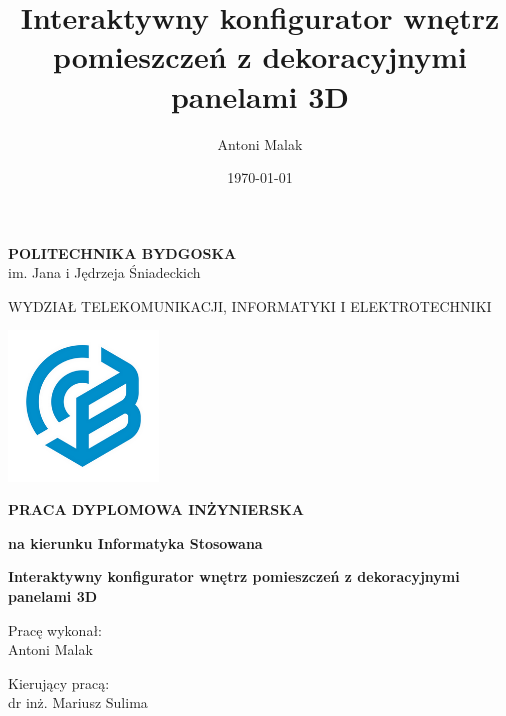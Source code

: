 \documentclass{article} %
\title{Interaktywny konfigurator wnętrz pomieszczeń z dekoracyjnymi panelami 3D} %
\author{Antoni Malak} %
\date{\today} %
\begin{document}

\thispagestyle{empty}

\begin{center}
 \Large \textbf{POLITECHNIKA BYDGOSKA} \\
  im. Jana i Jędrzeja Śniadeckich \\
\end{center}

\begin{center}
\end{center}

\begin{center}
 \LARGE WYDZIAŁ TELEKOMUNIKACJI, INFORMATYKI I ELEKTROTECHNIKI \\
\end{center}

\begin{center}
 \includegraphics[width=4cm,height=4cm]{logo.png}
\end{center}

\begin{center}
 \Large \textbf{PRACA DYPLOMOWA INŻYNIERSKA}
\end{center}

\begin{center}
 \large \textbf{na kierunku Informatyka Stosowana}
\end{center}

\vspace{2cm}

\begin{center}
 \LARGE \textbf{Interaktywny konfigurator wnętrz pomieszczeń z dekoracyjnymi panelami 3D}
\end{center}

\vspace{2cm}

\begin{minipage}{2in}
Pracę wykonał: \\
Antoni Malak\\
\end{minipage}
\hfill
\begin{minipage}{1.3in}
Kierujący pracą: \\
dr inż. Mariusz Sulima
\end{minipage}
\end{document}
